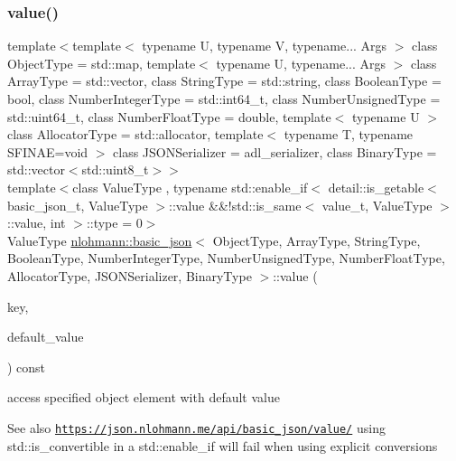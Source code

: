 \subsubsection{\texorpdfstring{value()}{value()}\hspace{0.1cm}{\footnotesize\ttfamily [1/4]}}
{\footnotesize\ttfamily template$<$template$<$ typename U, typename V, typename... Args $>$ class Object\+Type = std\+::map, template$<$ typename U, typename... Args $>$ class Array\+Type = std\+::vector, class String\+Type  = std\+::string, class Boolean\+Type  = bool, class Number\+Integer\+Type  = std\+::int64\+\_\+t, class Number\+Unsigned\+Type  = std\+::uint64\+\_\+t, class Number\+Float\+Type  = double, template$<$ typename U $>$ class Allocator\+Type = std\+::allocator, template$<$ typename T, typename S\+F\+I\+N\+A\+E=void $>$ class J\+S\+O\+N\+Serializer = adl\+\_\+serializer, class Binary\+Type  = std\+::vector$<$std\+::uint8\+\_\+t$>$$>$ \\
template$<$class Value\+Type , typename std\+::enable\+\_\+if$<$ detail\+::is\+\_\+getable$<$ basic\+\_\+json\+\_\+t, Value\+Type $>$\+::value \&\&!std\+::is\+\_\+same$<$ value\+\_\+t, Value\+Type $>$\+::value, int $>$\+::type  = 0$>$ \\
Value\+Type \hyperlink{classnlohmann_1_1basic__json}{nlohmann\+::basic\+\_\+json}$<$ Object\+Type, Array\+Type, String\+Type, Boolean\+Type, Number\+Integer\+Type, Number\+Unsigned\+Type, Number\+Float\+Type, Allocator\+Type, J\+S\+O\+N\+Serializer, Binary\+Type $>$\+::value (\begin{DoxyParamCaption}\item[{const typename object\+\_\+t\+::key\+\_\+type \&}]{key,  }\item[{const Value\+Type \&}]{default\+\_\+value }\end{DoxyParamCaption}) const\hspace{0.3cm}{\ttfamily [inline]}}



access specified object element with default value 

\begin{DoxySeeAlso}{See also}
\href{https://json.nlohmann.me/api/basic_json/value/}{\tt https\+://json.\+nlohmann.\+me/api/basic\+\_\+json/value/} using std\+::is\+\_\+convertible in a std\+::enable\+\_\+if will fail when using explicit conversions 
\end{DoxySeeAlso}
\mbox{\label{classnlohmann_1_1basic__json_adcfdefe95d5c2471a5c97e911d46ee88}} 
